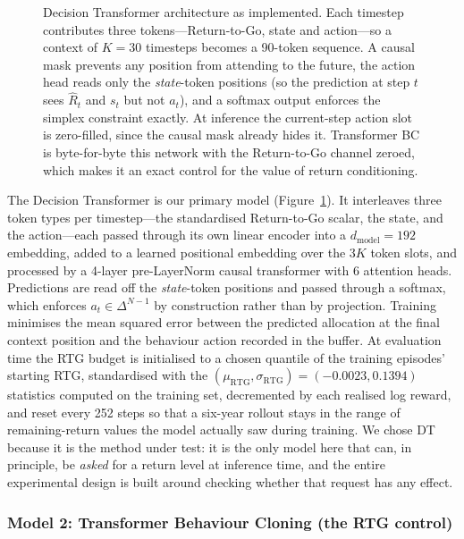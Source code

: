\documentclass[11pt]{article}
\begin{document}
\begin{figure}[t]
\caption{Decision Transformer architecture as implemented. Each timestep contributes three
tokens---Return-to-Go, state and action---so a context of $K=30$ timesteps becomes a
90-token sequence. A causal mask prevents any position from attending to the future, the
action head reads only the \emph{state}-token positions (so the prediction at step $t$ sees
$\hat{R}_t$ and $s_t$ but not $a_t$), and a softmax output enforces the simplex constraint
exactly. At inference the current-step action slot is zero-filled, since the causal mask
already hides it. Transformer BC is byte-for-byte this network with the Return-to-Go channel
zeroed, which makes it an exact control for the value of return conditioning.}
\label{fig:dt}
\end{figure}

The Decision Transformer \cite{chen2021decision} is our primary model
(Figure~\ref{fig:dt}). It interleaves three token types per timestep---the standardised
Return-to-Go scalar, the state, and the action---each passed through its own linear encoder
into a $d_{\text{model}}=192$ embedding, added to a learned positional embedding over the
$3K$ token slots, and processed by a 4-layer pre-LayerNorm causal transformer with 6 attention
heads. Predictions are read off the \emph{state}-token positions and passed through a softmax,
which enforces $a_t \in \Delta^{N-1}$ by construction rather than by projection. Training
minimises the mean squared error between the predicted allocation at the final context
position and the behaviour action recorded in the buffer. At evaluation time the RTG budget is
initialised to a chosen quantile of the training episodes' starting RTG, standardised with the
$(\mu_{\text{RTG}}, \sigma_{\text{RTG}}) = (-0.0023, 0.1394)$ statistics computed on the
training set, decremented by each realised log reward, and reset every 252 steps so that a
six-year rollout stays in the range of remaining-return values the model actually saw during
training. We chose DT because it is the method under test: it is the only model here that can,
in principle, be \emph{asked} for a return level at inference time, and the entire
experimental design is built around checking whether that request has any effect.

\subsubsection{Model 2: Transformer Behaviour Cloning (the RTG control)}
\end{document}
